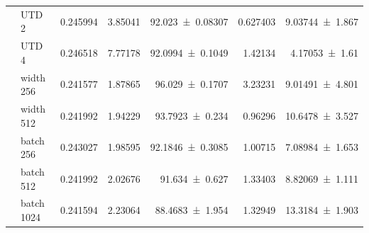 {\begin{longtable}{@{}llrrrrr@{}}
     & UTD 2 & \num{0.245994} & \num{3.85041} & \num{92.023+-0.08307} & \num{0.627403} & \num{9.03744+-1.867} \\
     & UTD 4 & \num{0.246518} & \num{7.77178} & \num{92.0994+-0.1049} & \num{1.42134} & \num{4.17053+-1.61} \\
     & width 256 & \num{0.241577} & \num{1.87865} & \num{96.029+-0.1707} & \num{3.23231} & \num{9.01491+-4.801} \\
     & width 512 & \num{0.241992} & \num{1.94229} & \num{93.7923+-0.234} & \num{0.96296} & \num{10.6478+-3.527} \\
     & batch 256 & \num{0.243027} & \num{1.98595} & \num{92.1846+-0.3085} & \num{1.00715} & \num{7.08984+-1.653} \\
     & batch 512 & \num{0.241992} & \num{2.02676} & \num{91.634+-0.627} & \num{1.33403} & \num{8.82069+-1.111} \\
     & batch 1024 & \num{0.241594} & \num{2.23064} & \num{88.4683+-1.954} & \num{1.32949} & \num{13.3184+-1.903} \\
  \end{longtable}
}
